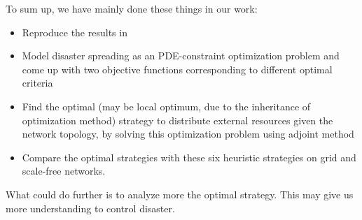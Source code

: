 To sum up, we have mainly done these things in our work:
\begin{itemize}
	\item Reproduce the results in \cite{buzna2007efficient}
	\item Model disaster spreading as an PDE-constraint optimization problem and come up with two objective functions corresponding to different optimal criteria
	\item Find the optimal (may be local optimum, due to the inheritance of optimization method) strategy to distribute external resources given the network topology, by solving this optimization problem using adjoint method 
	\item Compare the optimal strategies with these six heuristic strategies on grid and scale-free networks. 
\end{itemize}

What could do further is to analyze more the optimal strategy. This may give us more understanding to control disaster.